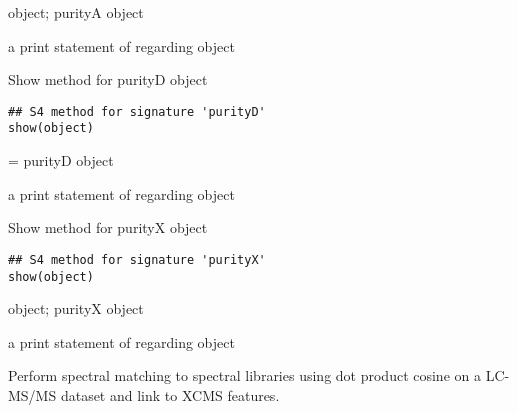 \documentclass[letterpaper]{book}
\begin{document}
%
\begin{Arguments}
\begin{ldescription}
\item[\code{object}] object; purityA object
\end{ldescription}
\end{Arguments}
%
\begin{Value}
a print statement of regarding object
\end{Value}
%
\begin{Description}\relax
Show method for purityD object
\end{Description}
%
\begin{Usage}
\begin{verbatim}
## S4 method for signature 'purityD'
show(object)
\end{verbatim}
\end{Usage}
%
\begin{Arguments}
\begin{ldescription}
\item[\code{object}] = purityD object
\end{ldescription}
\end{Arguments}
%
\begin{Value}
a print statement of regarding object
\end{Value}
%
\begin{Description}\relax
Show method for purityX object
\end{Description}
%
\begin{Usage}
\begin{verbatim}
## S4 method for signature 'purityX'
show(object)
\end{verbatim}
\end{Usage}
%
\begin{Arguments}
\begin{ldescription}
\item[\code{object}] object; purityX object
\end{ldescription}
\end{Arguments}
%
\begin{Value}
a print statement of regarding object
\end{Value}
%
\begin{Description}\relax
Perform spectral matching to spectral libraries using dot product cosine on a LC-MS/MS dataset and link to XCMS features.
\end{Description}
\end{document}
